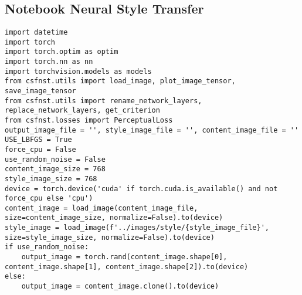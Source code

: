 \appendix
\chapter{}

\section{Notebook Neural Style Transfer}
\label{sec:nootebook_neural_style_transfer}
\begin{listing}[H]
\begin{verbatim}
import datetime
import torch
import torch.optim as optim
import torch.nn as nn
import torchvision.models as models
from csfnst.utils import load_image, plot_image_tensor, save_image_tensor
from csfnst.utils import rename_network_layers, replace_network_layers, get_criterion
from csfnst.losses import PerceptualLoss
output_image_file = '', style_image_file = '', content_image_file = ''
USE_LBFGS = True
force_cpu = False
use_random_noise = False
content_image_size = 768
style_image_size = 768
device = torch.device('cuda' if torch.cuda.is_available() and not force_cpu else 'cpu')
content_image = load_image(content_image_file, size=content_image_size, normalize=False).to(device)
style_image = load_image(f'../images/style/{style_image_file}', size=style_image_size, normalize=False).to(device)
if use_random_noise:
    output_image = torch.rand(content_image.shape[0], content_image.shape[1], content_image.shape[2]).to(device)
else:
    output_image = content_image.clone().to(device)
\end{verbatim}
\label{lst:notebook_neural_style_transfer_1}
\end{listing}

